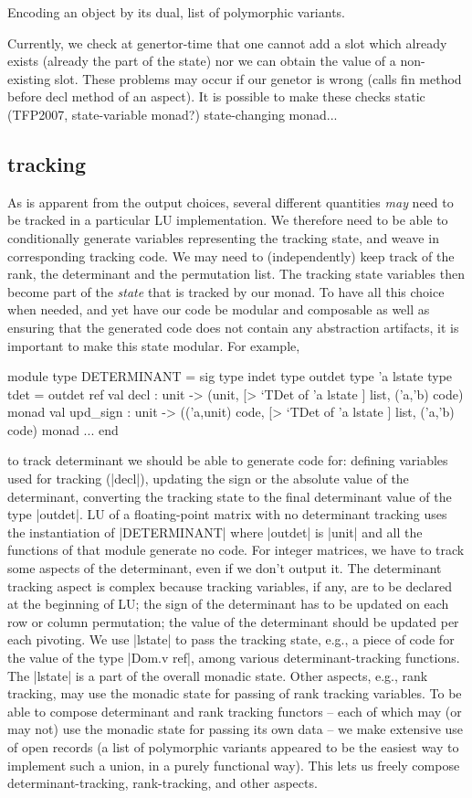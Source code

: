 \documentclass[draft]{elsart}
\begin{document}
Encoding an object by its dual,
list of polymorphic variants.

Currently, we check at genertor-time that one cannot add a slot which
already exists (already the part of the state) nor we can obtain the
value of a non-existing slot. These problems may occur if our genetor
is wrong (calls fin method before decl method of an aspect). It is
possible to make these checks static (TFP2007, state-variable monad?)
state-changing monad...


\subsection{tracking}

As is apparent from the output choices, several different quantities
\emph{may} need to be tracked in a particular LU implementation.  We
therefore need to be able to conditionally generate variables
representing the tracking state, and weave in corresponding tracking
code. We may need to (independently) keep track of the rank, the
determinant and the permutation list.  The tracking state variables
then become part of the \emph{state} that is tracked by our monad.  To
have all this choice when needed, and yet have our code be modular and
composable as well as ensuring that the generated code does not
contain any abstraction artifacts, it is important to make this state
modular.  For example,
\begin{code}
module type DETERMINANT = sig
  type indet  type outdet  type 'a lstate
  type tdet = outdet ref   
  val decl : unit -> 
    (unit, [> `TDet of 'a lstate ] list, ('a,'b) code) monad
  val upd_sign : unit -> 
    (('a,unit) code, [> `TDet of 'a lstate ] list, ('a,'b) code) monad
  ...
end
\end{code}
\noindent  to track determinant we should be able to generate code
for: defining variables used for tracking (|decl|),
updating the sign or the absolute
value of the determinant, converting the tracking state
to the final determinant value of the type |outdet|. LU of a
floating-point matrix with no determinant tracking uses the
instantiation of |DETERMINANT| where |outdet| is |unit| and all the
functions of that module generate no code. For integer matrices, we
have to track some aspects of the determinant, even if we don't output
it. The determinant tracking aspect is complex because tracking
variables, if any, are to be declared at the beginning of LU; the sign
of the determinant has to be updated on each row or column
permutation; the value of the determinant should be updated per each
pivoting. We use |lstate| to pass the tracking state, e.g., a piece of
code for the value of the type |Dom.v ref|, among
various determinant-tracking functions. The |lstate| is a part of the
overall monadic state. Other aspects, e.g., rank tracking, may use the
monadic state for passing of rank tracking variables. To be able to
compose determinant and rank tracking functors -- each of which may
(or may not) use the monadic state for passing its own data -- we make
extensive use of open records (a list of polymorphic variants
appeared to be the easiest way to implement such a union, in a purely
functional way). This lets us freely compose determinant-tracking,
rank-tracking, and other aspects.
\end{document}
